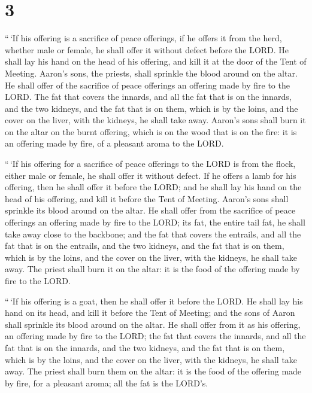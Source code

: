 \hypertarget{section-2}{%
\section{3}\label{section-2}}

 ``\,`If his offering is a sacrifice of peace offerings, if
he offers it from the herd, whether male or female, he shall offer it
without defect before the LORD.  He shall lay his hand on
the head of his offering, and kill it at the door of the Tent of
Meeting. Aaron's sons, the priests, shall sprinkle the blood around on
the altar.  He shall offer of the sacrifice of peace
offerings an offering made by fire to the LORD. The fat that covers the
innards, and all the fat that is on the innards,  and the
two kidneys, and the fat that is on them, which is by the loins, and the
cover on the liver, with the kidneys, he shall take away. 
Aaron's sons shall burn it on the altar on the burnt offering, which is
on the wood that is on the fire: it is an offering made by fire, of a
pleasant aroma to the LORD.

 ``\,`If his offering for a sacrifice of peace offerings to
the LORD is from the flock, either male or female, he shall offer it
without defect.  If he offers a lamb for his offering, then
he shall offer it before the LORD;  and he shall lay his
hand on the head of his offering, and kill it before the Tent of
Meeting. Aaron's sons shall sprinkle its blood around on the altar.
 He shall offer from the sacrifice of peace offerings an
offering made by fire to the LORD; its fat, the entire tail fat, he
shall take away close to the backbone; and the fat that covers the
entrails, and all the fat that is on the entrails,  and the
two kidneys, and the fat that is on them, which is by the loins, and the
cover on the liver, with the kidneys, he shall take away. 
The priest shall burn it on the altar: it is the food of the offering
made by fire to the LORD.

 ``\,`If his offering is a goat, then he shall offer it
before the LORD.  He shall lay his hand on its head, and
kill it before the Tent of Meeting; and the sons of Aaron shall sprinkle
its blood around on the altar.  He shall offer from it as
his offering, an offering made by fire to the LORD; the fat that covers
the innards, and all the fat that is on the innards,  and
the two kidneys, and the fat that is on them, which is by the loins, and
the cover on the liver, with the kidneys, he shall take away.
 The priest shall burn them on the altar: it is the food of
the offering made by fire, for a pleasant aroma; all the fat is the
LORD's.

